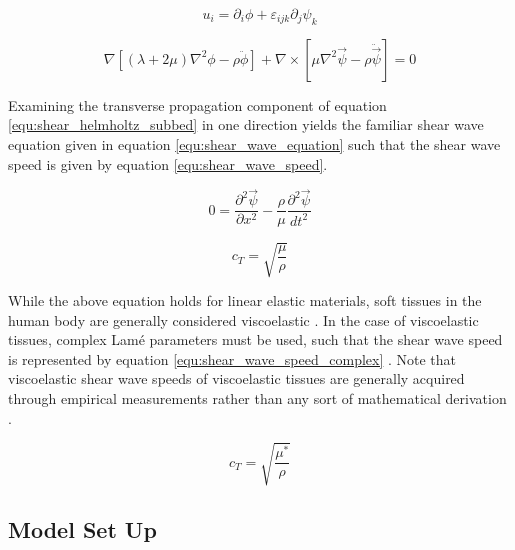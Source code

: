 			\begin{equation}
				\label{equ:shear_helmholtz_decomp}
				u_i = \partial_i \phi + \varepsilon_{ijk}\partial_j\psi_k
			\end{equation}

			\begin{equation}
				\label{equ:shear_helmholtz_subbed}
				\nabla\left[\left(\lambda + 2\mu\right) \nabla^2 \phi - \rho \ddot{\phi}\right] + \nabla \times \left[\mu \nabla^2 \vec{\psi} - \rho\ddot{\vec{\psi}}\right] = 0
			\end{equation}

			Examining the transverse propagation component of equation \ref{equ:shear_helmholtz_subbed} in one direction yields the familiar shear wave equation given in equation \ref{equ:shear_wave_equation} such that the shear wave speed is given by equation \ref{equ:shear_wave_speed}.

			\begin{equation}
				\label{equ:shear_wave_equation}
				0 = \frac{\partial^2 \vec{\psi}}{\partial x^2} - \frac{\rho}{\mu}\frac{\partial^2 \vec{\psi}}{dt^2}
			\end{equation}

			\begin{equation}
				\label{equ:shear_wave_speed}
				c_T = \sqrt{\frac{\mu}{\rho}}
			\end{equation}

			While the above equation holds for linear elastic materials, soft tissues in the human body are generally considered viscoelastic . In the case of viscoelastic tissues, complex Lam\'{e} parameters must be used, such that the shear wave speed is represented by equation \ref{equ:shear_wave_speed_complex} . Note that viscoelastic shear wave speeds of viscoelastic tissues are generally acquired through empirical measurements rather than any sort of mathematical derivation .

			\begin{equation}
				\label{equ:shear_wave_speed_complex}
				c_T = \sqrt{\frac{\mu^*}{\rho}}
			\end{equation}

		\subsection{Model Set Up}

